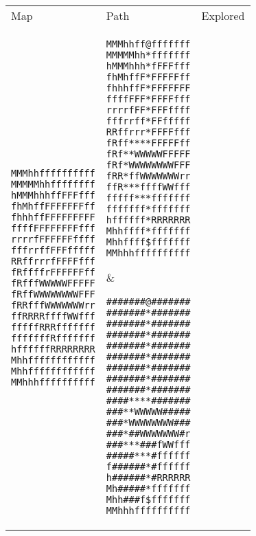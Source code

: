 \documentclass[12pt, article]{scrartcl}
\begin{document}
\begin{tabular}{p{2in} p{2in} p{2in}}
Map & Path & Explored \\

\begin{verbatim}
MMMhhffffffffff
MMMMMhhffffffff
hMMMhhhffFFFfff
fhMhffFFFFFFFff
fhhhffFFFFFFFFF
ffffFFFFFFFFfff
rrrrfFFFFFFffff
fffrrffFFFfffff
RRffrrrfFFFFfff
fRffffrFFFFFFff
fRfffWWWWWFFFFF
fRffWWWWWWWWFFF
fRRfffWWWWWWWrr
ffRRRRffffWWfff
fffffRRRfffffff
fffffffRfffffff
hffffffRRRRRRRR
Mhhffffffffffff
Mhhffffffffffff
MMhhhffffffffff
\end{verbatim}
&
\begin{verbatim}
MMMhhff@fffffff
MMMMMhh*fffffff
hMMMhhh*fFFFfff
fhMhffF*FFFFFff
fhhhffF*FFFFFFF
ffffFFF*FFFFfff
rrrrfFF*FFFffff
fffrrff*FFfffff
RRffrrr*FFFFfff
fRff****FFFFFff
fRf**WWWWWFFFFF
fRf*WWWWWWWWFFF
fRR*ffWWWWWWWrr
ffR***ffffWWfff
fffff***fffffff
fffffff*fffffff
hffffff*RRRRRRR
Mhhffff*fffffff
Mhhffff$fffffff
MMhhhffffffffff
\end{verbatim}
&
\begin{verbatim}
#######@#######
#######*#######
#######*#######
#######*#######
#######*#######
#######*#######
#######*#######
#######*#######
#######*#######
####****#######
###**WWWWW#####
###*WWWWWWWW###
###*##WWWWWWW#r
###***###fWWfff
#####***#ffffff
f######*#ffffff
h######*#RRRRRR
Mh#####*fffffff
Mhh###f$fffffff
MMhhhffffffffff
\end{verbatim}
\end{tabular}
\end{document}
